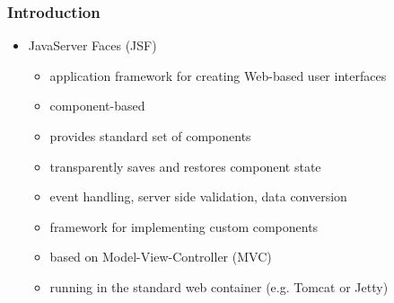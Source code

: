 \documentclass[10pt,xcolor=pdflatex]{beamer}
\begin{document}
\begin{frame}\frametitle{Introduction}
	\begin{itemize}
		\item JavaServer Faces (JSF)
          \begin{itemize}
        	\item application framework for creating Web-based user interfaces
        	\item component-based
        	\item provides standard set of components
        	\item transparently saves and restores component state
        	\item event handling, server side validation, data conversion
        	\item framework for implementing custom components
            \medskip
            \item based on Model-View-Controller (MVC) 
            \item running in the standard web container (e.g. Tomcat or Jetty)
          \end{itemize}
	\end{itemize}
\end{frame}
\end{document}
